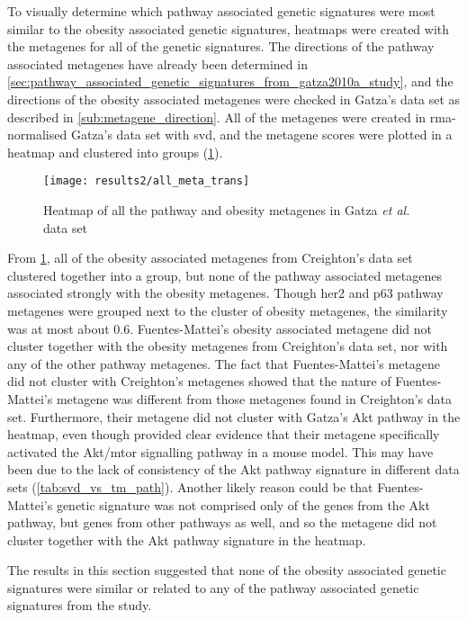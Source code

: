 \noindent
To visually determine which pathway associated genetic signatures were most similar to the obesity associated genetic signatures, heatmaps were created with the metagenes for all of the genetic signatures.
The directions of the pathway associated metagenes have already been determined in \cref{sec:pathway_associated_genetic_signatures_from_gatza2010a_study}, and the directions of the obesity associated metagenes were checked in Gatza's data set as described in \cref{sub:metagene_direction}.
All of the metagenes were created in \gls{rma}-normalised Gatza's data set with \gls{svd}, and the metagene scores were plotted in a heatmap and clustered into groups (\cref{fig:gatza_allmeta}).

\begin{figure}[htpb]
	\centering
	\texttt{[image: results2/all\_meta\_trans]}
	\caption{Heatmap of all the pathway and obesity metagenes in Gatza \textit{et al.} data set}
	\label{fig:gatza_allmeta}
\end{figure}

From \cref{fig:gatza_allmeta}, all of the obesity associated metagenes from Creighton's data set clustered together into a group, but none of the pathway associated metagenes associated strongly with the obesity metagenes.
Though \gls{her2} and p63 pathway metagenes were grouped next to the cluster of obesity metagenes, the similarity was at most about 0.6.
Fuentes-Mattei's obesity associated metagene did not cluster together with the obesity metagenes from Creighton's data set, nor with any of the other pathway metagenes.
The fact that Fuentes-Mattei's metagene did not cluster with Creighton's metagenes showed that the nature of Fuentes-Mattei's metagene was different from those metagenes found in Creighton's data set.
Furthermore, their metagene did not cluster with Gatza's Akt pathway in the heatmap, even though \citet{Fuentes-Mattei2014} provided clear evidence that their metagene specifically activated the Akt/\gls{mtor} signalling pathway in a mouse model.
This may have been due to the lack of consistency of the Akt pathway signature in different data sets (\cref{tab:svd_vs_tm_path}).
Another likely reason could be that Fuentes-Mattei's genetic signature was not comprised only of the genes from the Akt pathway, but genes from other pathways as well, and so the metagene did not cluster together with the Akt pathway signature in the heatmap.

The results in this section suggested that none of the obesity associated genetic signatures were similar or related to any of the pathway associated genetic signatures from the \citet{Gatza2010a} study.

